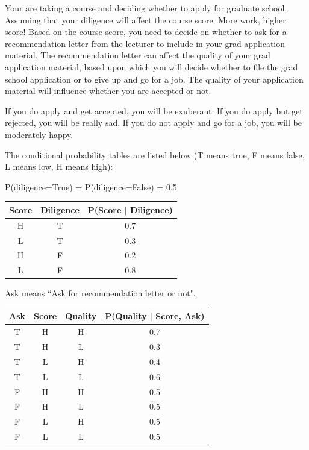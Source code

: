 \documentclass[12pt]{article}
\begin{document}
Your are taking a course and deciding whether to apply for graduate school. Assuming that your diligence will affect the course score. More work, higher score! Based on the course score, you need to decide on whether to ask for a recommendation letter from the lecturer to include in your grad application material. The recommendation letter can affect the quality of your grad application material, based upon which you will decide whether to file the grad school application or to give up and go for a job. The quality of your application material will influence whether you are accepted or not.

If you do apply and get accepted, you will be exuberant. If you do apply but get rejected, you will be really sad. If you do not apply and go for a job, you will be moderately happy.

The conditional probability tables are listed below (T means true, F means false, L means low, H means high):

P(diligence=True) = P(diligence=False) = 0.5
\begin{table}[!htb]
    \centering
    \begin{tabular}{c|c|c}
        \hline
        Score & Diligence & P(Score $\mid$ Diligence)  \\
        \hline
        H     &  T        & 0.7                 \\
        L     &  T        & 0.3                 \\
        H     &  F        & 0.2                 \\
        L     &  F        & 0.8                 \\
        \hline
    \end{tabular}
\end{table}

Ask means ``Ask for recommendation letter or not".
\begin{table}[!htb]
    \centering
    \begin{tabular}{c|c|c|c}
        \hline
        Ask   & Score  &  Quality & P(Quality $\mid$ Score, Ask)  \\
        \hline
        T     &  H   &  H     & 0.7                 \\
        T     &  H   &  L     & 0.3                 \\
        T     &  L   &  H     & 0.4                 \\
        T     &  L   &  L     & 0.6                 \\
        F     &  H   &  H     & 0.5                 \\
        F     &  H   &  L     & 0.5                 \\
        F     &  L   &  H     & 0.5                 \\
        F     &  L   &  L     & 0.5                 \\
        \hline
    \end{tabular}
\end{table}
\end{document}
